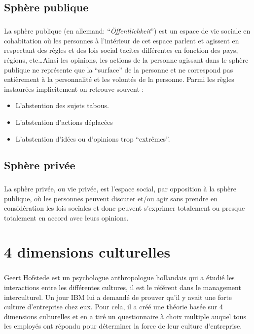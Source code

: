\section{Sphère publique}

\paragraph{} La sphère publique (en allemand: ``\textit{Öffentlichkeit}'') est
un espace de vie sociale en cohabitation où les personnes à l'intérieur de cet
espace parlent et agissent en respectant des règles et des lois social tacites
différentes en fonction des pays, régions, etc\ldots Ainsi les opinions, les
actions de la personne agissant dans le sphère publique ne représente que la
``surface'' de la personne et ne correspond pas entièrement à la personnalité
et les volontés de la personne. Parmi les règles instaurées implicitement on
retrouve souvent :

\begin{itemize}
	\item L'abstention des sujets tabous.
	\item L'abstention d'actions déplacées
	\item L'abstention d'idées ou d'opinions trop ``extrêmes''.
\end{itemize}

\section{Sphère privée}

\paragraph{} La sphère privée, ou vie privée, est l'espace social, par
opposition à la sphère publique, où les personnes peuvent discuter et/ou agir
sans prendre en considération les lois sociales et donc peuvent s'exprimer
totalement ou presque totalement en accord avec leurs opinions.

\chapter{4 dimensions culturelles}

\paragraph{} Geert Hofstede est un psychologue anthropologue hollandais qui a
étudié les interactions entre les différentes cultures, il est le référent dans
le management interculturel. Un jour IBM lui a demandé de prouver qu’il y avait
une forte culture d’entreprise chez eux. Pour cela, il a créé une théorie basée
sur 4 dimensions culturelles et en a tiré un questionnaire à choix multiple
auquel tous les employés ont répondu pour déterminer la force de leur culture
d’entreprise.

